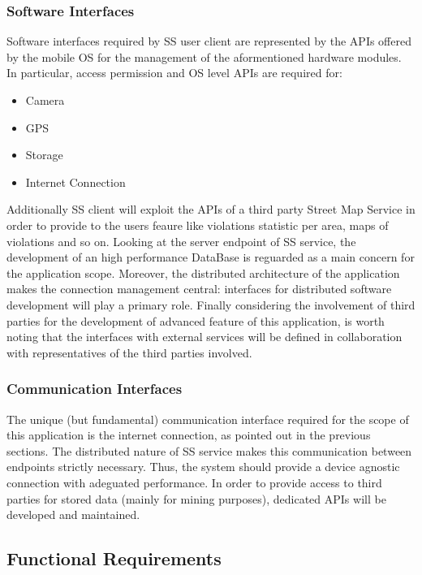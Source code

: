 	\subsubsection{Software Interfaces}
	Software interfaces required by SS user client are represented by the APIs offered by the mobile OS for the management of the aformentioned hardware modules. In particular, access permission and OS level APIs are required for:
	\begin{itemize} 
		\item Camera
		\item GPS
		\item Storage
		\item Internet Connection
	\end{itemize}
	Additionally SS client will exploit the APIs of a third party Street Map Service in order to provide to the users feaure like violations statistic per area, maps of violations and so on.\newline
		Looking at the server endpoint of SS service, the development of an high performance DataBase is reguarded as a main concern for the application scope. Moreover, the distributed architecture of the application makes the connection management central: interfaces for distributed software development will play a primary role. \newline
	Finally considering the involvement of third parties for the development of advanced feature of this application, is worth noting that the interfaces with external services will be defined in collaboration with representatives of the third parties involved.
	 
	\subsubsection{Communication Interfaces}
	 The unique (but fundamental) communication interface required for the scope of this application is the internet connection, as pointed out in the previous sections. The distributed nature of SS service makes this communication between endpoints strictly necessary. Thus, the system should provide a device agnostic  connection with adeguated performance.\newline
	In order to provide access to  third parties for stored data (mainly for mining purposes), dedicated APIs will be developed and maintained.
	
	\clearpage
	
\subsection{Functional Requirements}
\bigskip


